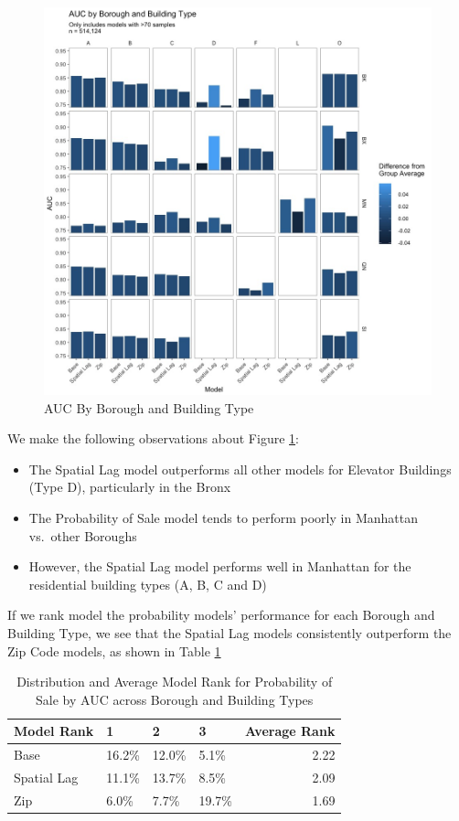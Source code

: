 \documentclass[12pt,]{article}
\providecommand{\tightlist}{%
  \setlength{\itemsep}{0pt}\setlength{\parskip}{0pt}}
\begin{document}
\begin{figure}[H]
\includegraphics[width=1\linewidth]{Sections/tables and figures/AUC by boro and build type} \caption{AUC By Borough and Building Type}\label{fig:AUC by boro and build type}
\end{figure}

We make the following observations about Figure
\ref{fig:AUC by boro and build type}:

\begin{itemize}
\tightlist
\item
  The Spatial Lag model outperforms all other models for Elevator
  Buildings (Type D), particularly in the Bronx
\item
  The Probability of Sale model tends to perform poorly in Manhattan
  vs.~other Boroughs
\item
  However, the Spatial Lag model performs well in Manhattan for the
  residential building types (A, B, C and D)
\end{itemize}

If we rank model the probability models' performance for each Borough
and Building Type, we see that the Spatial Lag models consistently
outperform the Zip Code models, as shown in Table
\ref{tab:ProbModelAUCRank}

\begin{table}

\caption{\label{tab:Prob Model AUC Average Rank}\label{tab:ProbModelAUCRank} Distribution and Average Model Rank for Probability of Sale by AUC across Borough and Building Types}
\centering
\begin{tabular}[t]{llllr}
\toprule
Model Rank & 1 & 2 & 3 & Average Rank\\
\midrule
Base & 16.2\% & 12.0\% & 5.1\% & 2.22\\
Spatial Lag & 11.1\% & 13.7\% & 8.5\% & 2.09\\
Zip & 6.0\% & 7.7\% & 19.7\% & 1.69\\
\bottomrule
\end{tabular}
\end{table}
\end{document}
